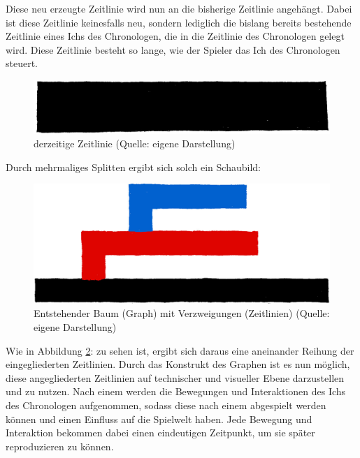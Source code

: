 Diese neu erzeugte Zeitlinie wird nun an die bisherige Zeitlinie angehängt. Dabei ist diese Zeitlinie keinesfalls neu, sondern lediglich die bislang bereits bestehende Zeitlinie eines Ichs des Chronologen, die in die Zeitlinie des Chronologen gelegt wird. Diese Zeitlinie besteht so lange, wie der Spieler das Ich des Chronologen steuert.
\begin{figure}[ht]
\centering
\includegraphics[width=0.5\linewidth]{content/pictures/Timeline.jpg}
\caption{derzeitige Zeitlinie (Quelle: eigene Darstellung)}
\label{fig:timeline}
\end{figure}
Durch mehrmaliges Splitten ergibt sich solch ein Schaubild:
\begin{figure}[ht]
\centering
\includegraphics[width=1\linewidth]{content/pictures/Merge.jpg}
\caption{Entstehender Baum (Graph) mit Verzweigungen (Zeitlinien) (Quelle: eigene Darstellung)}
\label{fig:graph}
\end{figure}
Wie in Abbildung \ref{fig:graph}:  zu sehen ist, ergibt sich daraus eine aneinander Reihung der eingegliederten Zeitlinien. Durch das Konstrukt des Graphen ist es nun möglich, diese angegliederten Zeitlinien auf technischer und visueller Ebene darzustellen und zu nutzen.
Nach einem  werden die Bewegungen und Interaktionen des Ichs des Chronologen aufgenommen, sodass diese nach einem  abgespielt werden können und einen Einfluss auf die Spielwelt haben. Jede Bewegung und Interaktion bekommen dabei einen eindeutigen Zeitpunkt, um sie später reproduzieren zu können.

